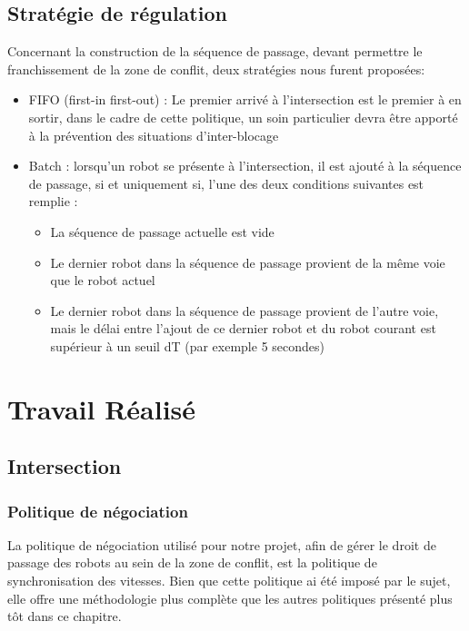 \documentclass[french,a4paper,12pt]{report}
\begin{document}
\chapter{Stratégie de régulation}
Concernant la construction de la séquence de passage, devant permettre le franchissement de la zone de conflit, deux stratégies nous furent proposées:

\begin{itemize}
\item FIFO (first-in first-out) : 
	Le premier arrivé à l’intersection est le premier à en sortir, dans le cadre de cette
	politique, un soin particulier devra être apporté à la prévention des situations d’inter-blocage
	
\item Batch : lorsqu’un robot se présente à l’intersection, il est ajouté à la séquence de passage, si et
	uniquement si, l’une des deux conditions suivantes est remplie :
	\begin{itemize}
	\item La séquence de passage actuelle est vide
	\item Le dernier robot dans la séquence de passage provient de la même voie que le robot actuel
	\item Le dernier robot dans la séquence de passage provient de l’autre voie, mais le délai entre l’ajout
		de ce dernier robot et du robot courant est supérieur à un seuil dT (par exemple 5 secondes)
	\end{itemize}
\end{itemize}


\part{Travail Réalisé}

\chapter{Intersection}

\section{Politique de négociation}
La politique de négociation utilisé pour notre projet, afin de gérer le droit de passage des robots au sein de la zone de conflit, est la politique de synchronisation des vitesses. Bien que cette politique ai été imposé par le sujet, elle offre une méthodologie plus complète que les autres politiques présenté plus tôt dans ce chapitre.
\end{document}
